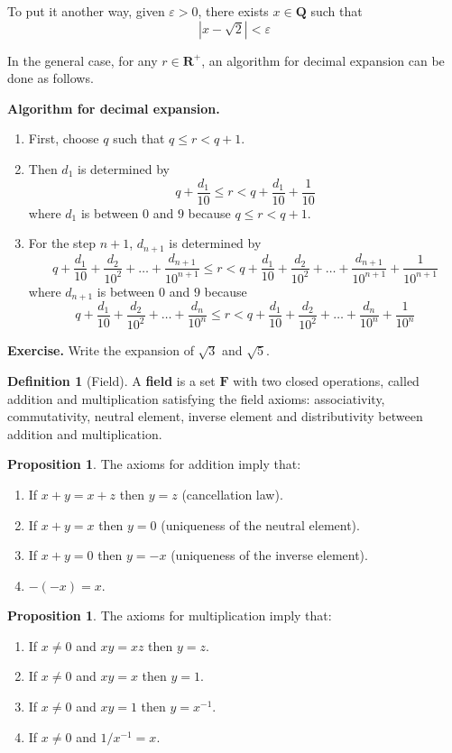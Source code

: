 \documentclass[12pt,a4paper]{article}
\theoremstyle{definition}
\newtheorem{proposition}[theorem]{Proposition}
\newtheorem{definition}{Definition}[section]
\begin{document}
To put it another way, given $\varepsilon > 0$, there exists $x \in \textbf{Q}$ such that \[ | x - \sqrt{2} | < \varepsilon \]

In the general case, for any $r \in \textbf{R}^+$, an algorithm for decimal expansion can be done as follows. 

\textbf{Algorithm for decimal expansion.}

\begin{enumerate}
	\item First, choose $q$ such that $ q \leq r < q + 1 $.
	\item Then $d_1$ is determined by \[ q + \frac{d_1}{10} \leq r < q + \frac{d_1}{10} + \frac{1}{10} \] where $d_1$ is between $0$ and $9$ because $ q \leq r < q + 1 $.
	\item For the step $n+1$, $d_{n+1}$ is determined by
	\[ q + \frac{d_1}{10} + \frac{d_2}{10^2} + \ldots + \frac{d_{n+1}}{10^{n+1}} \leq r < q + \frac{d_1}{10} + \frac{d_2}{10^2} + \ldots + \frac{d_{n+1}}{10^{n+1}} + \frac{1}{10^{n+1}} \]
	where $d_{n+1}$ is between $0$ and $9$ because 
	\[ q + \frac{d_1}{10} + \frac{d_2}{10^2} + \ldots + \frac{d_n}{10^n} \leq r < q + \frac{d_1}{10} + \frac{d_2}{10^2} + \ldots + \frac{d_n}{10^n} + \frac{1}{10^n} \]
\end{enumerate}

\textbf{Exercise.} Write the expansion of $\sqrt{3}$ and $\sqrt{5}$.

\begin{definition}[Field]
  A \textbf{field} is a set $\textbf{F}$ with two closed operations, called addition and multiplication satisfying the field axioms: associativity, commutativity, neutral element, inverse element and distributivity between addition and multiplication.
\end{definition}

\begin{proposition}
  The axioms for addition imply that:
  \begin{enumerate}
    \item If $x+y = x+z$ then $y = z$ (cancellation law).
    \item If $x+y = x$ then $y = 0$ (uniqueness of the neutral element).
    \item If $x+y = 0$ then $y = -x$ (uniqueness of the inverse element).
    \item $-(-x) = x$.
  \end{enumerate}
\end{proposition}

\begin{proposition}
  The axioms for multiplication imply that:
  \begin{enumerate}
    \item If $x \neq 0$ and $xy = xz$ then $y = z$.
    \item If $x \neq 0$ and $xy = x$ then $y = 1$.
    \item If $x \neq 0$ and $xy = 1$ then $y = x^{-1}$.
    \item If $x \neq 0$ and $1/x^{-1} = x$.
  \end{enumerate}
\end{proposition}
\end{document}
